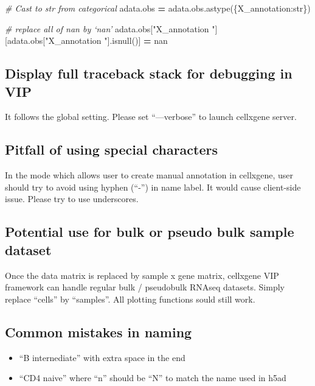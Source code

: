 \documentclass[
]{article}
\newenvironment{Shaded}{\begin{snugshade}}{\end{snugshade}}
\newcommand{\CommentTok}[1]{\textcolor[rgb]{0.56,0.35,0.01}{\textit{#1}}}
\newcommand{\NormalTok}[1]{#1}
\newcommand{\OperatorTok}[1]{\textcolor[rgb]{0.81,0.36,0.00}{\textbf{#1}}}
\newcommand{\StringTok}[1]{\textcolor[rgb]{0.31,0.60,0.02}{#1}}
\providecommand{\tightlist}{%
  \setlength{\itemsep}{0pt}\setlength{\parskip}{0pt}}
\begin{document}
\begin{Shaded}
\begin{Highlighting}[]
\CommentTok{\# Cast to str from categorical}
\NormalTok{adata.obs }\OperatorTok{=}\NormalTok{ adata.obs.astype(\{}\StringTok{\textquotesingle{}X\_annotation\textquotesingle{}}\NormalTok{:}\StringTok{\textquotesingle{}str\textquotesingle{}}\NormalTok{\})}

\CommentTok{\# replace all of nan by ‘nan’}
\NormalTok{adata.obs[}\StringTok{"X\_annotation "}\NormalTok{][adata.obs[}\StringTok{"X\_annotation "}\NormalTok{].isnull()] }\OperatorTok{=} \StringTok{\textquotesingle{}nan\textquotesingle{}}
\end{Highlighting}
\end{Shaded}

\hypertarget{display-full-traceback-stack-for-debugging-in-vip}{%
\subsection{Display full traceback stack for debugging in VIP}\label{display-full-traceback-stack-for-debugging-in-vip}}

It follows the global setting. Please set ``---verbose'' to launch cellxgene server.

\hypertarget{pitfall-of-using-special-characters}{%
\subsection{Pitfall of using special characters}\label{pitfall-of-using-special-characters}}

In the mode which allows user to create manual annotation in cellxgene, user should try to avoid using hyphen (``-'') in name label. It would cause client-side issue. Please try to use underscores.

\hypertarget{potential-use-for-bulk-or-pseudo-bulk-sample-dataset}{%
\subsection{Potential use for bulk or pseudo bulk sample dataset}\label{potential-use-for-bulk-or-pseudo-bulk-sample-dataset}}

Once the data matrix is replaced by sample x gene matrix, cellxgene VIP framework can handle regular bulk / pseudobulk RNAseq datasets. Simply replace ``cells'' by ``samples''. All plotting functions sould still work.

\hypertarget{common-mistakes-in-naming}{%
\subsection{Common mistakes in naming}\label{common-mistakes-in-naming}}

\begin{itemize}
\tightlist
\item
  ``B internediate'' with extra space in the end
\item
  ``CD4 naive'' where ``n'' should be ``N'' to match the name used in h5ad
\end{itemize}
\end{document}
